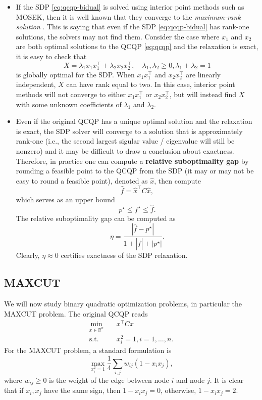 \documentclass[
]{book}
\theoremstyle{definition}
\theoremstyle{definition}
\theoremstyle{definition}
\theoremstyle{definition}
\theoremstyle{remark}
\begin{document}
\begin{itemize}
\item
  If the SDP \eqref{eq:qcqp-bidual} is solved using interior point methods such as MOSEK, then it is well known that they converge to the \emph{maximum-rank solution} \citep{wolkowicz12book-sdp}. This is saying that even if the SDP \eqref{eq:qcqp-bidual} has rank-one solutions, the solvers may not find them. Consider the case where \(x_1\) and \(x_2\) are both optimal solutions to the QCQP \eqref{eq:qcqp} and the relaxation is exact, it is easy to check that
  \[
  X = \lambda_1 x_1 x_1^\top+ \lambda_2 x_2 x_2^\top, \quad \lambda_1, \lambda_2 \geq 0, \lambda_1 + \lambda_2 = 1
  \]
  is globally optimal for the SDP. When \(x_1 x_1^\top\) and \(x_2 x_2^\top\) are linearly independent, \(X\) can have rank equal to two. In this case, interior point methods will not converge to either \(x_1x_1^\top\) or \(x_2 x_2^\top\), but will instead find \(X\) with some unknown coefficients of \(\lambda_1\) and \(\lambda_2\).
\item
  Even if the original QCQP has a unique optimal solution and the relaxation is exact, the SDP solver will converge to a solution that is approximately rank-one (i.e., the second largest sigular value / eigenvalue will still be nonzero) and it may be difficult to draw a conclusion about exactness. Therefore, in practice one can compute a \textbf{relative suboptimality gap} by rounding a feasible point to the QCQP from the SDP (it may or may not be easy to round a feasible point), denoted as \(\hat{x}\), then compute
  \[
  \hat{f} = \hat{x}^\top C \hat{x},
  \]
  which serves as an upper bound
  \[
  p^\star \leq f^\star \leq \hat{f}.
  \]
  The relative suboptimality gap can be computed as
  \[
  \eta = \frac{|\hat{f} - p^\star|}{1 + |\hat{f}| + |p^\star|}.
  \]
  Clearly, \(\eta \approx 0\) certifies exactness of the SDP relaxation.
\end{itemize}

\subsection{MAXCUT}\label{maxcut}

We will now study binary quadratic optimization problems, in particular the MAXCUT problem. The original QCQP reads
\begin{equation}
\begin{split}
\min_{x \in \mathbb{R}^{n}} & \quad x^\top C x \\
\mathrm{s.t.}& \quad x_i^2 = 1, i=1,\dots,n.
\end{split}
\label{eq:bqp}
\end{equation}
For the MAXCUT problem, a standard formulation is
\begin{equation}
\max_{x_i^2 = 1}  \frac{1}{4} \sum_{i,j} w_{ij} (1 - x_i x_j),
\label{eq:maxcut-org}
\end{equation}
where \(w_{ij} \geq 0\) is the weight of the edge between node \(i\) and node \(j\).
It is clear that if \(x_i, x_j\) have the same sign, then \(1- x_i x_j = 0\), otherwise, \(1- x_i x_j = 2\).
\end{document}
